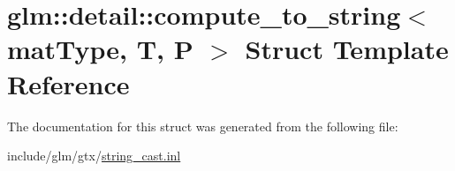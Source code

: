 \hypertarget{structglm_1_1detail_1_1compute__to__string}{}\section{glm\+:\+:detail\+:\+:compute\+\_\+to\+\_\+string$<$ mat\+Type, T, P $>$ Struct Template Reference}
\label{structglm_1_1detail_1_1compute__to__string}


The documentation for this struct was generated from the following file\+:\begin{DoxyCompactItemize}
\item 
include/glm/gtx/\hyperlink{string__cast_8inl}{string\+\_\+cast.\+inl}\end{DoxyCompactItemize}
